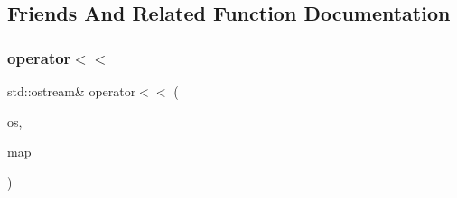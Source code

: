 \subsection{Friends And Related Function Documentation}
\mbox{\label{classLinkedHashMap_a98e6d7a4ebf5ff3bcb6a62268ae57280}} 
\subsubsection{\texorpdfstring{operator$<$$<$}{operator<<}}
{\footnotesize\ttfamily std\+::ostream\& operator$<$$<$ (\begin{DoxyParamCaption}\item[{std\+::ostream \&}]{os,  }\item[{const \mbox{\hyperlink{classLinkedHashMap}{Linked\+Hash\+Map}}$<$ K, V $>$ \&}]{map }\end{DoxyParamCaption})\hspace{0.3cm}{\ttfamily [friend]}}

